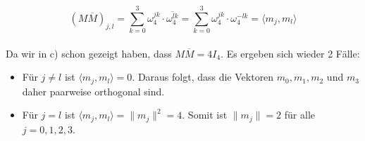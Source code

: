\documentclass[12pt]{scrartcl}
\begin{document}
\begin{enumAlph}
    \[(M\overline{M})_{j,l}=\sum_{k=0}^{3} \omega_4^{jk}\cdot \overline{\omega_4^{lk}}
    = \sum_{k=0}^{3} \omega_4^{jk}\cdot \omega_4^{-lk}= \langle m_j,m_l \rangle\]\\

    Da wir in c) schon gezeigt haben, dass $M\overline{M} = 4I_4$. Es ergeben sich wieder 2 Fälle:

    \begin{itemize}
        \item[] Für $j \neq l$ ist $\langle m_j,m_l \rangle = 0$. Daraus folgt, dass die Vektoren $m_0,m_1,m_2$ und $m_3$ daher paarweise orthogonal sind.

        \item[] Für $j=l$ ist $\langle m_j,m_l \rangle = \lVert m_j \lVert ^2 = 4$. Somit ist $\lVert m_j \lVert = 2$ für alle $j=0,1,2,3$.
        
    \end{itemize}

    
     
\end{enumAlph}


\newpage



\end{document}
